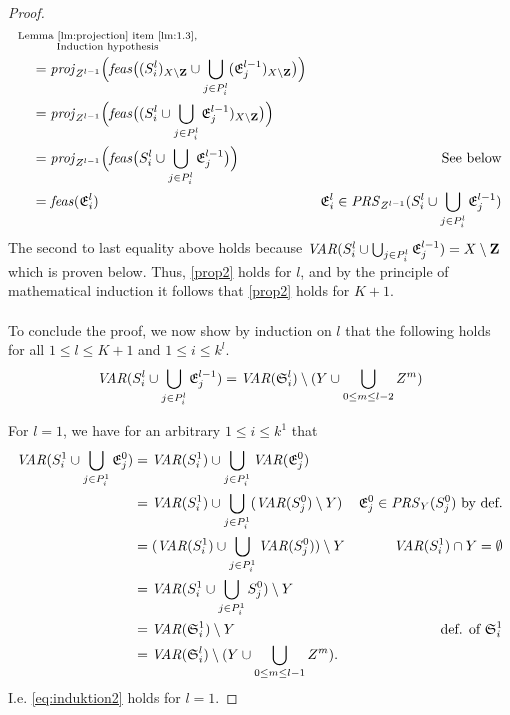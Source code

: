 \begin{proof}
\begin{align*}
&\substack{\text{Lemma~\ref{lm:projection} item \ref{lm:1.3}},\\\text{Induction hypothesis}}\\
&\quad = \mathit{proj}_{Z^{l-1}}\Big(\mathit{feas}\big((S^l_i)_{X\setminus\mathbf{Z}}\cup\bigcup_{j\in P^l_i}(\mathfrak{E}^{l-1}_j)_{X\setminus \mathbf{Z}}\big)\Big)\\
&\quad = \mathit{proj}_{Z^{l-1}}\Big(\mathit{feas}\big((S^l_i\cup\bigcup_{j\in P^l_i}\mathfrak{E}^{l-1}_j)_{X\setminus \mathbf{Z}}\big)\Big)\\
&\quad = \mathit{proj}_{Z^{l-1}}\Big(\mathit{feas}\big(S^l_i\cup\bigcup_{j\in P^l_i}\mathfrak{E}^{l-1}_j\big)\Big)&\text{See below}\\
&\quad = \mathit{feas}(\mathfrak{E}^l_i)&\mathfrak{E}^l_i\in \mathit{PRS}_{Z^{l-1}}(S^l_i\cup\bigcup_{j\in P^l_i}\mathfrak{E}^{l-1}_j)
\end{align*}
The second to last equality above holds because $\mathit{VAR}(S^l_i \cup\bigcup_{j\in P^l_i}\mathfrak{E}^{l-1}_j )= X\setminus\mathbf{Z}$ which is proven below.
Thus, \eqref{prop2} holds for $l$, and by the principle of mathematical induction it follows that \eqref{prop2} holds for $K+1$.
\\\\
To conclude the proof, we now show by induction on $l$ that the following holds for all $1\leq l\leq K+1$ and $1\leq i\leq k^l$.
\begin{equation}\label{eq:induktion2}
\mathit{VAR}(S^l_i \cup\bigcup_{j\in P^l_i}\mathfrak{E}^{l-1}_j )= \mathit{VAR}(\mathfrak{S}^l_i)\setminus (Y\cup\bigcup_{0\leq m\leq l-2} Z^m)
\end{equation}

For $l = 1$, we have for an arbitrary $1\leq i\leq k^1$ that 
\begin{align*}
\mathit{VAR}(S^1_i \cup\bigcup_{j\in P^1_i}\mathfrak{E}^0_j) 
& = \mathit{VAR}(S^1_i) \cup\bigcup_{j\in P^1_i}\mathit{VAR}(\mathfrak{E}^0_j) \\
& = \mathit{VAR}(S^1_i) \cup\bigcup_{j\in P^1_i}(\mathit{VAR}(S^0_j)\setminus Y) &\mathfrak{E}^0_j\in\mathit{PRS}_Y(S^0_j)\text{ by def.}\\
& = (\mathit{VAR}(S^1_i) \cup\bigcup_{j\in P^1_i}\mathit{VAR}(S^0_j))\setminus Y & \mathit{VAR}(S^1_i) \cap Y = \emptyset\\  
& = \mathit{VAR}(S^1_i \cup\bigcup_{j\in P^1_i}S^0_j)\setminus Y\\  
& = \mathit{VAR}(\mathfrak{S}^1_i)\setminus Y & \text{def. of } \mathfrak{S}^1_i\\  
& = \mathit{VAR}(\mathfrak{S}^l_i)\setminus (Y\cup\bigcup_{0\leq m\leq l-1} Z^m).
\end{align*}
I.e. \eqref{eq:induktion2} holds for $l=1$.


\end{proof}
